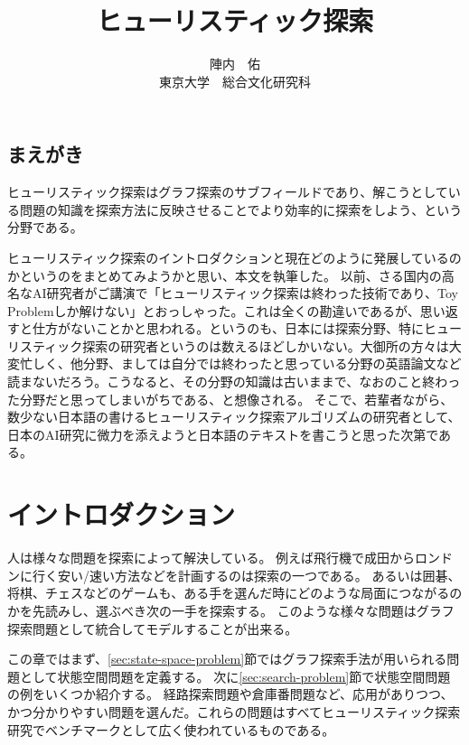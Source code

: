 \documentclass{report}
\title{ヒューリスティック探索}
\author{陣内　佑 \\
東京大学　総合文化研究科}
\begin{document}
\maketitle

\tableofcontents
\newpage

\section*{まえがき}
ヒューリスティック探索はグラフ探索のサブフィールドであり、解こうとしている問題の知識を探索方法に反映させることでより効率的に探索をしよう、という分野である。

ヒューリスティック探索のイントロダクションと現在どのように発展しているのかというのをまとめてみようかと思い、本文を執筆した。
以前、さる国内の高名なAI研究者がご講演で「ヒューリスティック探索は終わった技術であり、Toy Problemしか解けない」とおっしゃった。これは全くの勘違いであるが、思い返すと仕方がないことかと思われる。というのも、日本には探索分野、特にヒューリスティック探索の研究者というのは数えるほどしかいない。大御所の方々は大変忙しく、他分野、ましては自分では終わったと思っている分野の英語論文など読まないだろう。こうなると、その分野の知識は古いままで、なおのこと終わった分野だと思ってしまいがちである、と想像される。
そこで、若輩者ながら、数少ない日本語の書けるヒューリスティック探索アルゴリズムの研究者として、日本のAI研究に微力を添えようと日本語のテキストを書こうと思った次第である。


\chapter{イントロダクション}
\label{ch:introduction}

人は様々な問題を探索によって解決している。
例えば飛行機で成田からロンドンに行く安い/速い方法などを計画するのは探索の一つである。
あるいは囲碁、将棋、チェスなどのゲームも、ある手を選んだ時にどのような局面につながるのかを先読みし、選ぶべき次の一手を探索する。
このような様々な問題はグラフ探索問題として統合してモデルすることが出来る。


この章ではまず、\ref{sec:state-space-problem}節ではグラフ探索手法が用いられる問題として状態空間問題を定義する。
次に\ref{sec:search-problem}節で状態空間問題の例をいくつか紹介する。
経路探索問題や倉庫番問題など、応用がありつつ、かつ分かりやすい問題を選んだ。これらの問題はすべてヒューリスティック探索研究でベンチマークとして広く使われているものである。
\end{document}
